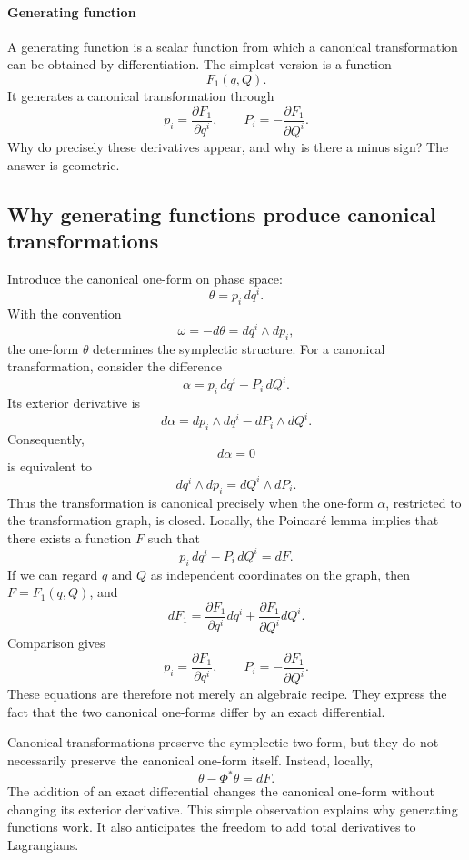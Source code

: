 \paragraph{Generating function}
A generating function is a scalar function from which a canonical
transformation can be obtained by differentiation.
The simplest version is a function
\[
F_1(q,Q).
\]
It generates a canonical transformation through
\[
\boxed{
p_i=\frac{\partial F_1}{\partial q^i},
\qquad
P_i=-\frac{\partial F_1}{\partial Q^i}.
}
\]
Why do precisely these derivatives appear, and why is there a minus sign?
The answer is geometric.

\subsection{Why generating functions produce canonical transformations}
Introduce the canonical one-form on phase space:
\[
\theta=p_i\,dq^i.
\]
With the convention
\[
\omega=-d\theta=dq^i\wedge dp_i,
\]
the one-form \(\theta\) determines the symplectic structure.
For a canonical transformation, consider the difference
\[
\alpha=p_i\,dq^i-P_i\,dQ^i.
\]
Its exterior derivative is
\[
d\alpha
=dp_i\wedge dq^i-dP_i\wedge dQ^i.
\]
Consequently,
\[
d\alpha=0
\]
is equivalent to
\[
dq^i\wedge dp_i=dQ^i\wedge dP_i.
\]
Thus the transformation is canonical precisely when the one-form \(\alpha\),
restricted to the transformation graph, is closed.
Locally, the Poincaré lemma implies that there exists a function \(F\) such
that
\[
\boxed{
p_i\,dq^i-P_i\,dQ^i=dF.
}
\]
If we can regard \(q\) and \(Q\) as independent coordinates on the graph, then
\(F=F_1(q,Q)\), and
\[
dF_1=
\frac{\partial F_1}{\partial q^i}dq^i+
\frac{\partial F_1}{\partial Q^i}dQ^i.
\]
Comparison gives
\[
\boxed{
p_i=\frac{\partial F_1}{\partial q^i},
\qquad
P_i=-\frac{\partial F_1}{\partial Q^i}.
}
\]
These equations are therefore not merely an algebraic recipe.
They express the fact that the two canonical one-forms differ by an exact
differential.

Canonical transformations preserve the symplectic two-form, but they do not
necessarily preserve the canonical one-form itself.
Instead, locally,
\[
\boxed{\theta-\Phi^*\theta=dF.}
\]
The addition of an exact differential changes the canonical one-form without
changing its exterior derivative.
This simple observation explains why generating functions work.
It also anticipates the freedom to add total derivatives to Lagrangians.

